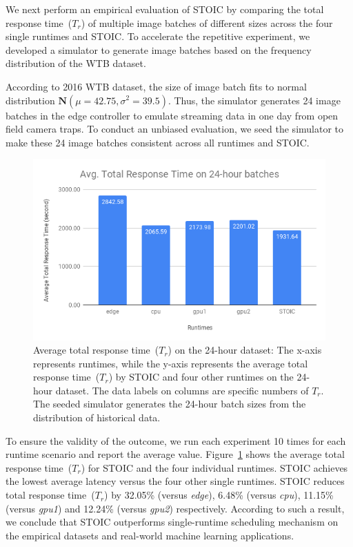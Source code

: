 %     


We next perform an empirical evaluation of STOIC by comparing the total response time~($T_r$) of multiple image batches of different sizes across the four single runtimes and STOIC.  To accelerate the repetitive experiment, we developed a simulator to generate image batches based on the frequency distribution of the WTB dataset. 

According to 2016 WTB dataset, the size of image batch fits to normal distribution $\mathbf{N}(\mu = 42.75, \sigma^2 = 39.5)$. Thus, the simulator generates 24 image batches in the edge controller to emulate streaming data in one day from open field camera traps. To conduct an unbiased evaluation, we seed the simulator to make these 24 image batches consistent across all runtimes and STOIC. 

\begin{figure}[t] \centering 
\includegraphics[scale=0.42]{figures/24-batches}
\caption{Average total response time~($T_r$) on the 24-hour dataset: The x-axis represents runtimes, while the y-axis represents the average total response time~($T_r$) by STOIC and four other runtimes on the 24-hour dataset. The data labels on columns are specific numbers of $T_r$. The seeded simulator generates the 24-hour batch sizes from the distribution of historical data. 
\label{fig:24-batch}}
\end{figure}

To ensure the validity of the outcome, we run each experiment 10 times for each runtime scenario and report the average value. Figure~\ref{fig:24-batch} shows the average total response time~($T_r$) for STOIC and the four individual runtimes. STOIC achieves the lowest average latency versus the four other single runtimes.  STOIC reduces total response time~($T_r$) by 32.05\% (versus \textit{edge}), 6.48\% (versus \textit{cpu}), 11.15\% (versus \textit{gpu1}) and 12.24\% (versus \textit{gpu2}) respectively. According to such a result, we conclude that STOIC outperforms single-runtime scheduling mechanism on the empirical datasets and real-world machine learning applications.
